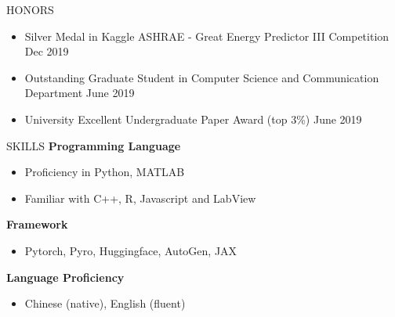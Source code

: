 \documentclass{resume} %
\begin{document}
\vspace{-4pt}
\begin{rSection}{HONORS}
\begin{itemize}
    \item Silver Medal in Kaggle ASHRAE - Great Energy Predictor III Competition \hfill Dec 2019
    \item Outstanding Graduate Student in Computer Science and Communication Department \hfill June 2019
    \item University Excellent Undergraduate Paper Award (top 3\%)  \hfill June 2019
\end{itemize}
\end{rSection} 

\vspace{-4pt}
\begin{rSection}{SKILLS} 
\textbf{Programming Language}
\begin{itemize}
    \item Proficiency in Python, MATLAB
    \item Familiar with C++, R, Javascript and LabView
\end{itemize}

\textbf{Framework}
\begin{itemize}
    \item Pytorch, Pyro, Huggingface, AutoGen, JAX
\end{itemize}

\textbf{Language Proficiency}
\begin{itemize}
    \item Chinese (native), English (fluent)
\end{itemize}

\end{rSection}
\end{document}

